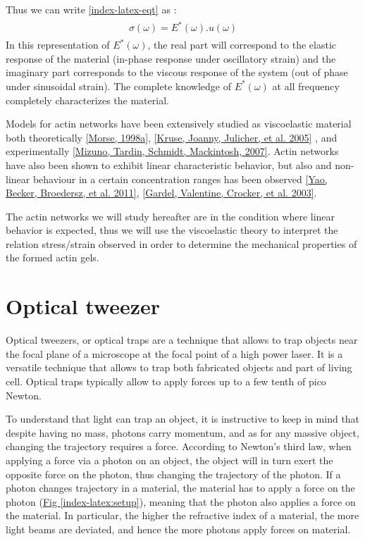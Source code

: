 \documentclass[A4paperpaper,11pt,english]{sphinxmanual}
\begin{document}
Thus we can write \eqref{index-latex-eqt} as :
\label{index-latex:equation-eqa17}\begin{gather}
\begin{split}\sigma(\omega) = E^*(\omega).u(\omega)\end{split}\label{index-latex-eqa17}
\end{gather}
In this representation of \(E^*(\omega)\), the real part will correspond to
the elastic response of the material (in-phase response
under oscillatory strain) and the imaginary part corresponds to the viscous response
of the system (out of phase under sinusoidal strain). The complete knowledge of
\(E^*(\omega)\) at all frequency completely characterizes the material.

Models for actin networks have been extensively studied as viscoelastic material
both theoretically {\hyperref[index-latex:morse1998a]{{[}Morse,  1998a{]}}}, {\hyperref[index-latex:kruse2005]{{[}Kruse, Joanny, Julicher,  et al.  2005{]}}} , and  experimentally
{\hyperref[index-latex:mizuno2007]{{[}Mizuno, Tardin, Schmidt, Mackintosh,  2007{]}}}.  Actin networks have also been shown to exhibit linear
characteristic behavior, but also and non-linear behaviour  in a certain concentration ranges has been observed {\hyperref[index-latex:yao2011]{{[}Yao, Becker, Broedersz,  et al.  2011{]}}}, {\hyperref[index-latex:gardel2003]{{[}Gardel, Valentine, Crocker,  et al.  2003{]}}}.

The actin networks we will study hereafter are in the condition where linear
behavior is expected, thus we will use the viscoelastic theory to interpret the
relation stress/strain observed in order to determine the mechanical properties
of the formed actin gels.


\section{Optical tweezer}
\label{index-latex:optical-tweezer}\label{index-latex:id77}
Optical tweezers, or optical traps are a technique that allows to trap objects
near the focal plane of a microscope at the focal point of a high power laser.
It is a versatile technique that allows to trap both fabricated objects and
part of living cell. Optical traps typically allow to apply forces up to a few tenth of
pico Newton.

To understand that light can trap an object, it is instructive to keep in mind
that despite having no mass, photons carry momentum, and as for any massive
object, changing the trajectory requires a force.  According to Newton's third
law, when applying a force via a photon on an object, the object will in turn
exert the opposite force on the photon, thus changing the trajectory of the
photon. If a photon changes trajectory in a material, the material has to apply a
force on the photon (\hyperref[index-latex:setup]{Fig  \ref*{index-latex:setup}}), meaning that the photon also applies a force on the
material. In particular, the higher the refractive index of a material, the
more light beams are deviated, and hence the more photons apply forces on
material.
\end{document}

